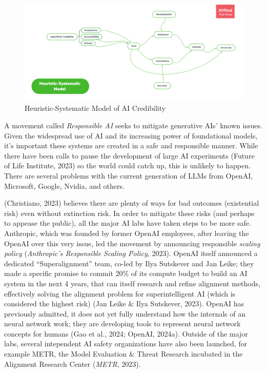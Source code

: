 \documentclass[
  letterpaper,
  DIV=11,
  numbers=noendperiod]{scrartcl}
\begin{document}
\begin{figure}[H]

{\centering \includegraphics[width=1\linewidth,height=\textheight,keepaspectratio]{./images/ai/ai-credibility.png}

}

\caption{Heuristic-Systematic Model of AI Credibility}

\end{figure}%

A movement called \emph{Responsible AI} seeks to mitigate generative
AIs' known issues. Given the widespread use of AI and its increasing
power of foundational models, it's important these systems are created
in a safe and responsible manner. While there have been calls to pause
the development of large AI experiments (Future of Life Institute, 2023)
so the world could catch up, this is unlikely to happen. There are
several problems with the current generation of LLMs from OpenAI,
Microsoft, Google, Nvidia, and others.

(Christiano, 2023) believes there are plenty of ways for bad outcomes
(existential risk) even without extinction risk. In order to mitigate
these risks (and perhaps to appease the public), all the major AI labs
have taken steps to be more safe. Anthropic, which was founded by former
OpenAI employees, after leaving the OpenAI over this very issue, led the
movement by announcing responsible \emph{scaling policy}
(\emph{Anthropic's {Responsible Scaling Policy}}, 2023). OpenAI itself
announced a dedicated ``Superalignment'' team, co-led by Ilya Sutskever
and Jan Leike; they made a specific promise to commit 20\% of its
compute budget to build an AI system in the next 4 years, that can
itself research and refine alignment methods, effectively solving the
alignment problem for superintelligent AI (which is considered the
highest risk) (Jan Leike \& Ilya Sutskever, 2023). OpenAI has previously
admitted, it does not yet fully understand how the internals of an
neural network work; they are developing tools to represent neural
network concepts for humans (Gao et al., 2024; OpenAI, 2024a). Outside
of the major labs, several intependent AI safety organizations have also
been launched, for example METR, the Model Evaluation \& Threat Research
incubated in the Alignment Research Center (\emph{{METR}}, 2023).
\end{document}
